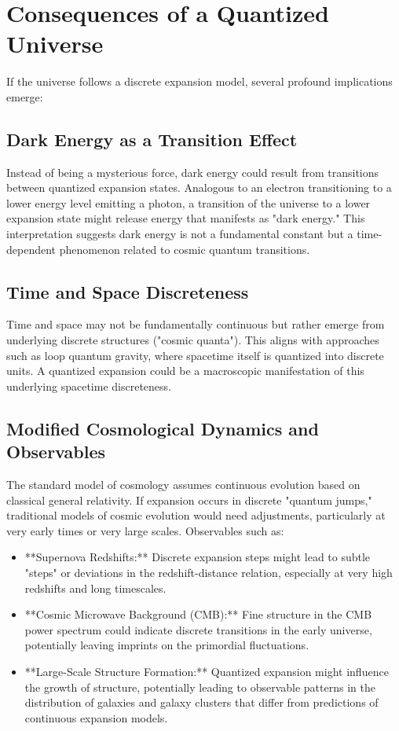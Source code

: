 \documentclass[12pt,a4paper]{article}
\begin{document}
	\section{Consequences of a Quantized Universe}
	
	If the universe follows a discrete expansion model, several profound implications emerge:
	
	\subsection{Dark Energy as a Transition Effect}
	Instead of being a mysterious force, dark energy could result from transitions between quantized expansion states.  Analogous to an electron transitioning to a lower energy level emitting a photon, a transition of the universe to a lower expansion state might release energy that manifests as "dark energy."  This interpretation suggests dark energy is not a fundamental constant but a time-dependent phenomenon related to cosmic quantum transitions.
	
	\subsection{Time and Space Discreteness}
	Time and space may not be fundamentally continuous but rather emerge from underlying discrete structures ("cosmic quanta").  This aligns with approaches such as loop quantum gravity, where spacetime itself is quantized into discrete units.  A quantized expansion could be a macroscopic manifestation of this underlying spacetime discreteness.
	
	\subsection{Modified Cosmological Dynamics and Observables}
	The standard model of cosmology assumes continuous evolution based on classical general relativity. If expansion occurs in discrete "quantum jumps," traditional models of cosmic evolution would need adjustments, particularly at very early times or very large scales. Observables such as:
	
	\begin{itemize}
		\item **Supernova Redshifts:**  Discrete expansion steps might lead to subtle "steps" or deviations in the redshift-distance relation, especially at very high redshifts and long timescales.
		\item **Cosmic Microwave Background (CMB):**  Fine structure in the CMB power spectrum could indicate discrete transitions in the early universe, potentially leaving imprints on the primordial fluctuations.
		\item **Large-Scale Structure Formation:**  Quantized expansion might influence the growth of structure, potentially leading to observable patterns in the distribution of galaxies and galaxy clusters that differ from predictions of continuous expansion models.
	\end{itemize}
	
\end{document}
